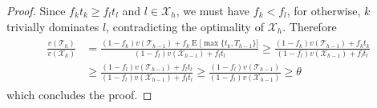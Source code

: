 \documentclass[12pt]{article} %
\DeclareMathOperator*{\argmax}{arg\,max}
\theoremstyle{definition}
\theoremstyle{definition}
\begin{document}
\begin{proof}
%
Since $f_k t_k \geq f_l t_l$ and $l \in \mathcal{X}_h$, we must have $f_k < f_l$, for otherwise, $k$ trivially dominates $l$, contradicting the optimality of $\mathcal{X}_h$. Therefore
\begin{align}
\begin{split}
\frac{v(\mathcal{T}_h)}{v(\mathcal{X}_h)}
&= \frac{(1 - f_k) v(\mathcal{T}_{h-1}) + f_k \operatorname{E}\bigl[\max\{ t_k, T_{h-1}\} \bigr]}{(1 - f_l) v(\mathcal{X}_{h-1}) + f_l t_l} \geq \frac{(1 - f_k) v(\mathcal{T}_{h-1}) + f_k t_k}{(1 - f_l) v(\mathcal{X}_{h-1}) + f_l t_l} \\
&\geq \frac{(1 - f_l) v(\mathcal{T}_{h-1}) +  f_l t_l}{(1 - f_l) v(\mathcal{X}_{h-1}) + f_l t_l}
\geq  \frac{(1 - f_l) v(\mathcal{T}_{h-1})}{(1 - f_l) v(\mathcal{X}_{h-1})} \geq \theta
\end{split}
\end{align}
which concludes the proof. 
\end{proof}
%
\end{document}

